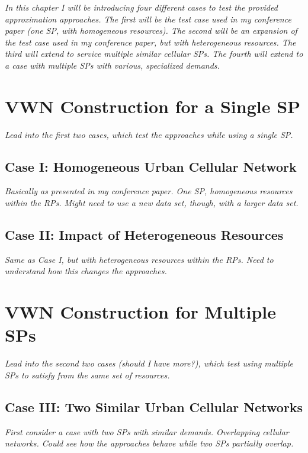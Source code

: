 \documentclass[12pt,dvips]{report}
\begin{document}
\textit{In this chapter I will be introducing four different cases to test the provided approximation approaches.  The first will be the test case used in my conference paper (one SP, with homogeneous resources).  The second will be an expansion of the test case used in my conference paper, but with heterogeneous resources.  The third will extend to service multiple similar cellular SPs.  The fourth will extend to a case with multiple SPs with various, specialized demands.}

\section{VWN Construction for a Single SP} \label{sec:onesp}

\textit{Lead into the first two cases, which test the approaches while using a single SP.}

\subsection{Case I: Homogeneous Urban Cellular Network} \label{subsec:onesp_homres}

\textit{Basically as presented in my conference paper.  One SP, homogeneous resources within the RPs.  Might need to use a new data set, though, with a larger data set.}

\subsection{Case II: Impact of Heterogeneous Resources} \label{subsec:onesp_hetres}

\textit{Same as Case I, but with heterogeneous resources within the RPs.  Need to understand how this changes the approaches.}

\section{VWN Construction for Multiple SPs} \label{sec:mulsp}

\textit{Lead into the second two cases (should I have more?), which test using multiple SPs to satisfy from the same set of resources.}

\subsection{Case III: Two Similar Urban Cellular Networks} \label{subsec:mulsp_sim}

\textit{First consider a case with two SPs with similar demands.  Overlapping cellular networks.  Could see how the approaches behave while two SPs partially overlap.}
\end{document}
